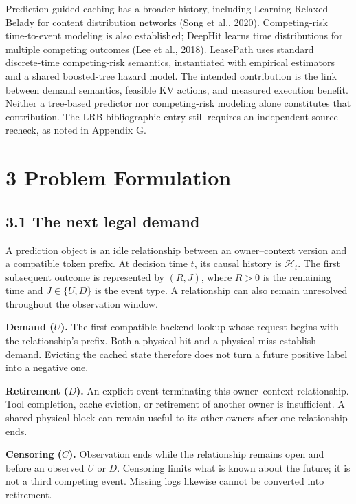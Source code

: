 \documentclass[
  english,
  10pt,
]{article}
\begin{document}
Prediction-guided caching has a broader history, including Learning
Relaxed Belady for content distribution networks (Song et al., 2020).
Competing-risk time-to-event modeling is also established; DeepHit
learns time distributions for multiple competing outcomes (Lee et al.,
2018). LeasePath uses standard discrete-time competing-risk semantics,
instantiated with empirical estimators and a shared boosted-tree hazard
model. The intended contribution is the link between demand semantics,
feasible KV actions, and measured execution benefit. Neither a
tree-based predictor nor competing-risk modeling alone constitutes that
contribution. The LRB bibliographic entry still requires an independent
source recheck, as noted in Appendix G.

\section{3 Problem Formulation}\label{problem-formulation}

\subsection{3.1 The next legal demand}\label{the-next-legal-demand}

A prediction object is an idle relationship between an owner--context
version and a compatible token prefix. At decision time \(t\), its
causal history is \(\mathcal H_t\). The first subsequent outcome is
represented by \((R,J)\), where \(R>0\) is the remaining time and
\(J\in\{U,D\}\) is the event type. A relationship can also remain
unresolved throughout the observation window.

\textbf{Demand (\(U\)).} The first compatible backend lookup whose
request begins with the relationship's prefix. Both a physical hit and a
physical miss establish demand. Evicting the cached state therefore does
not turn a future positive label into a negative one.

\textbf{Retirement (\(D\)).} An explicit event terminating this
owner--context relationship. Tool completion, cache eviction, or
retirement of another owner is insufficient. A shared physical block can
remain useful to its other owners after one relationship ends.

\textbf{Censoring (\(C\)).} Observation ends while the relationship
remains open and before an observed \(U\) or \(D\). Censoring limits
what is known about the future; it is not a third competing event.
Missing logs likewise cannot be converted into retirement.
\end{document}
